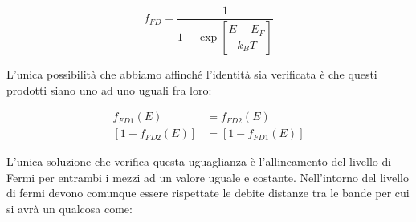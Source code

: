 \begin{equation}
	f_{FD} = \dfrac{1}{1 + \exp \left[\dfrac{E-E_F}{k_B T}\right]}
\end{equation}

L'unica possibilità che abbiamo affinché l'identità sia verificata è che questi prodotti siano uno ad uno uguali fra loro:

\begin{align}
f_{FD1}(E) &= f_{FD2}(E)\\
\left[1-f_{FD2}(E)\right] &= \left[ 1-f_{FD1}(E)\right]
\end{align}


L'unica soluzione che verifica questa uguaglianza è l'allineamento del livello di Fermi per entrambi i mezzi ad un valore uguale e costante.
Nell'intorno del livello di fermi devono comunque essere rispettate le debite distanze tra le bande per cui si avrà un qualcosa come:
